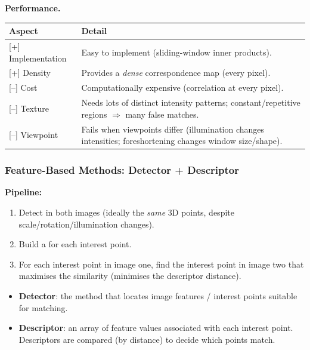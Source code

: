 \separator

\textbf{Performance.}
\begin{center}
\renewcommand{\arraystretch}{1.3}
\begin{tabular}{@{} l p{10cm} @{}}
\toprule
\textbf{Aspect} & \textbf{Detail} \\
\midrule
{[+]} Implementation & Easy to implement (sliding-window inner products). \\
{[+]} Density & Provides a \emph{dense} correspondence map (every pixel). \\
{[--]} Cost & Computationally expensive (correlation at every pixel). \\
{[--]} Texture & Needs lots of distinct intensity patterns; constant/repetitive regions $\Rightarrow$ many false matches. \\
{[--]} Viewpoint & Fails when viewpoints differ (illumination changes intensities; foreshortening changes window size/shape). \\
\bottomrule
\end{tabular}
\end{center}

\bigseparator

\subsubsection{Feature-Based Methods: Detector + Descriptor}

\textbf{Pipeline:}
\begin{enumerate}
  \item Detect  in both images (ideally the \emph{same} 3D points, despite scale/rotation/illumination changes).
  \item Build a  for each interest point.
  \item For each interest point in image one, find the interest point in image two that maximises the similarity (minimises the descriptor distance).
\end{enumerate}

\begin{defbox}
\begin{itemize}
  \item \textbf{Detector}: the method that locates image features / interest points suitable for matching.
  \item \textbf{Descriptor}: an array of feature values associated with each interest point. Descriptors are compared (by distance) to decide which points match.
\end{itemize}
\end{defbox}

